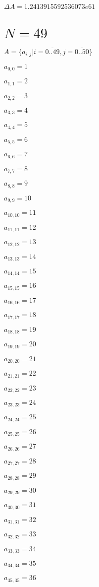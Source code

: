 \documentclass[a4paper,12pt]{article}
\begin{document}
$\Delta A = 1.2413915592536073e61$



\section{ $N = 49$ }
$A = \{ a _{ i, j } | i = \overline { 0..49 }, j = \overline { 0..50 } \}$

$a _{ 0, 0 } = 1$

$a _{ 1, 1 } = 2$

$a _{ 2, 2 } = 3$

$a _{ 3, 3 } = 4$

$a _{ 4, 4 } = 5$

$a _{ 5, 5 } = 6$

$a _{ 6, 6 } = 7$

$a _{ 7, 7 } = 8$

$a _{ 8, 8 } = 9$

$a _{ 9, 9 } = 10$

$a _{ 10, 10 } = 11$

$a _{ 11, 11 } = 12$

$a _{ 12, 12 } = 13$

$a _{ 13, 13 } = 14$

$a _{ 14, 14 } = 15$

$a _{ 15, 15 } = 16$

$a _{ 16, 16 } = 17$

$a _{ 17, 17 } = 18$

$a _{ 18, 18 } = 19$

$a _{ 19, 19 } = 20$

$a _{ 20, 20 } = 21$

$a _{ 21, 21 } = 22$

$a _{ 22, 22 } = 23$

$a _{ 23, 23 } = 24$

$a _{ 24, 24 } = 25$

$a _{ 25, 25 } = 26$

$a _{ 26, 26 } = 27$

$a _{ 27, 27 } = 28$

$a _{ 28, 28 } = 29$

$a _{ 29, 29 } = 30$

$a _{ 30, 30 } = 31$

$a _{ 31, 31 } = 32$

$a _{ 32, 32 } = 33$

$a _{ 33, 33 } = 34$

$a _{ 34, 34 } = 35$

$a _{ 35, 35 } = 36$
\end{document}
